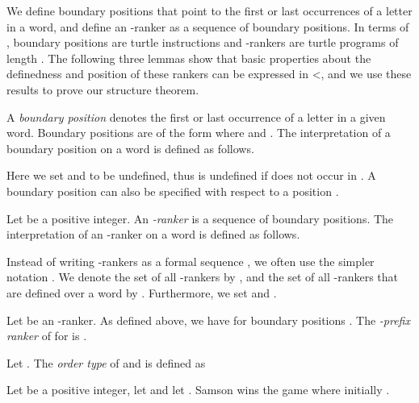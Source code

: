 \documentclass{LMCS}
\begin{document}
We define boundary positions that point to the first or last occurrences of
a letter in a word, and define an -ranker as a sequence of  boundary
positions. In terms of \cite{STV01}, boundary positions are turtle
instructions and -rankers are turtle programs of length . The
following three lemmas show that basic properties about the definedness and
position of these rankers can be expressed in <, and we use these
results to prove our structure theorem.

\begin{defi} \label{def:boundary-position}
  A \emph{boundary position} denotes the first or last
  occurrence of a letter in a given word. Boundary positions are of the form
   where  and . The
  interpretation of a boundary position  on a word  is defined as follows.
  
  Here we set  and  to be undefined, thus  is
  undefined if  does not occur in . A boundary position can also be
  specified with respect to a position .
  
\end{defi}

\begin{defi} \label{def:n-ranker}
  Let  be a positive integer. An \emph{-ranker}  is a sequence of
   boundary positions. The interpretation of an -ranker  on a word  is defined as follows.
  
\end{defi}

Instead of writing -rankers as a formal sequence , we
often use the simpler notation . We denote the set of all
-rankers by , and the set of all -rankers that
are defined over a word  by . Furthermore, we set
 and .

\begin{defi}
  Let  be an -ranker. As defined above, we have  for boundary positions . The \emph{-prefix ranker} of  for
   is  .
\end{defi}

\begin{defi} \label{def:order-type}
  Let . The \emph{order type} of  and  is defined as
  
\end{defi}

\begin{lem}
  \label{lem:ranker-sides}
  Let  be a positive integer, let  and let . Samson wins the game  where
  initially .
\end{lem}
\end{document}
